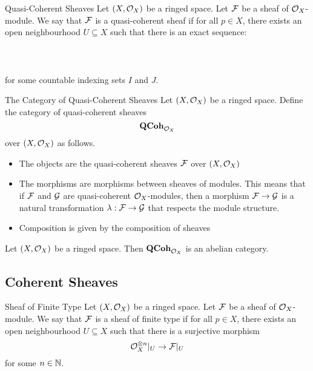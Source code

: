 \documentclass[a4paper]{article}
\begin{document}
\begin{defn}{Quasi-Coherent Sheaves}{} Let $(X,\mathcal{O}_X)$ be a ringed space. Let $\mathcal{F}$ be a sheaf of $\mathcal{O}_X$-module. We say that $\mathcal{F}$ is a quasi-coherent sheaf if for all $p\in X$, there exists an open neighbourhood $U\subseteq X$ such that there is an exact sequence: \\~\\
\\~\\
for some countable indexing sets $I$ and $J$. 
\end{defn}

\begin{defn}{The Category of Quasi-Coherent Sheaves}{} Let $(X,\mathcal{O}_X)$ be a ringed space. Define the category of quasi-coherent sheaves $$\bold{QCoh}_{\mathcal{O}_X}$$ over $(X,\mathcal{O}_X)$ as follows. 
\begin{itemize}
\item The objects are the quasi-coherent sheaves $\mathcal{F}$ over $(X,\mathcal{O}_X)$
\item The morphisms are morphisms between sheaves of modules. This means that if $\mathcal{F}$ and $\mathcal{G}$ are quasi-coherent $\mathcal{O}_X$-modules, then a morphism $\mathcal{F}\to\mathcal{G}$ is a natural transformation $\lambda:\mathcal{F}\to\mathcal{G}$ that respects the module structure. 
\item Composition is given by the composition of sheaves
\end{itemize}
\end{defn}

\begin{thm}{}{} Let $(X,\mathcal{O}_X)$ be a ringed space. Then $\bold{QCoh}_{\mathcal{O}_X}$ is an abelian category. 
\end{thm}

\subsection{Coherent Sheaves}
\begin{defn}{Sheaf of Finite Type}{}  Let $(X,\mathcal{O}_X)$ be a ringed space. Let $\mathcal{F}$ be a sheaf of $\mathcal{O}_X$-module. We say that $\mathcal{F}$ is a sheaf of finite type if for all $p\in X$, there exists an open neighbourhood $U\subseteq X$ such that there is a surjective morphism $$\mathcal{O}_X^{\otimes n}|_U\to\mathcal{F}|_U$$ for some $n\in\mathbb{N}$. 
\end{defn}
\end{document}
